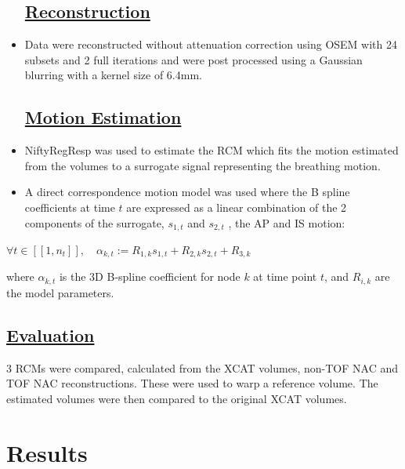 \documentclass[portrait,color=UCLburgundy,margin=2cm]{uclposter}
\begin{document}
\begin{multicols}{2}
\begin{itemize}
    \subsection*{\underline{\textbf{Reconstruction}}}
    \item Data were reconstructed without attenuation correction using OSEM with 24 subsets and 2 full iterations and were post processed using a Gaussian blurring with a kernel size of 6.4mm.
    
    \subsection*{\underline{\textbf{Motion Estimation}}}
    \item NiftyRegResp \cite{McClelland2013} was used to estimate the \gls{RCM} which fits the motion estimated from the volumes to a surrogate signal representing the breathing motion.
    \item A direct correspondence motion model was used where the B spline coefficients at time $t$ are expressed as a linear combination of the 2 components of the surrogate, $s_{1,t}$ and $s_{2,t}$ , the \gls{AP} and \gls{IS} motion:
\end{itemize}
    
\begin{center}
    \resizebox{1\hsize}{!}
    {
        $\forall t \in [[1,n_t]], \quad \alpha_{k,t} := R_{1,k} s_{1,t} + R_{2,k} s_{2,t} + R_{3,k}$
    }
\end{center}
    
\noindent where $\alpha_{k,t}$ is the 3D B-spline coefficient for node $k$ at time point $t$, and $R_{i,k}$ are the model parameters.
    
\begin{highlightbox}[UCLlightgreen]
    \subsection*{\underline{\textbf{Evaluation}}}
    3 \gls{RCM}s were compared, calculated from the XCAT volumes, non-\gls{TOF} \gls{NAC} and \gls{TOF} \gls{NAC} reconstructions. These were used to warp a reference volume. The estimated volumes were then compared to the original XCAT volumes.
\end{highlightbox}

\vspace{-2.0cm}

\section*{Results}
\begin{table}[H]
  \centering
  

\end{table}
\end{multicols}
\end{document}
